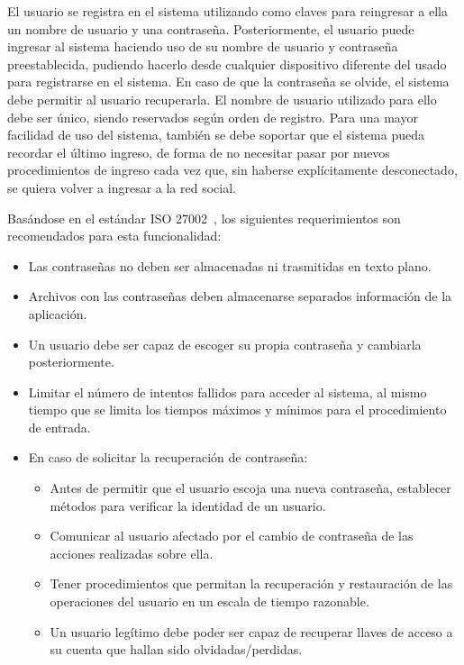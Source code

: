     El usuario se registra en el sistema utilizando como claves para reingresar a
    ella un nombre de usuario y una contraseña. Posteriormente, el usuario
    puede ingresar al sistema haciendo uso de su nombre de usuario y contraseña
    preestablecida, pudiendo hacerlo desde cualquier dispositivo diferente del
    usado para registrarse en el sistema. En caso de que la contraseña se
    olvide, el sistema debe permitir al usuario recuperarla. El nombre de
    usuario utilizado para ello debe ser único, siendo reservados según orden de
    registro. Para una mayor facilidad de uso del sistema, también se debe
    soportar que el sistema pueda recordar el último ingreso, de
    forma de no necesitar pasar por nuevos procedimientos de ingreso cada
    vez que, sin haberse explícitamente desconectado, se quiera volver a ingresar a la red social.

    Basándose en el estándar ISO
    27002~\cite{iso27002_2005}, los siguientes requerimientos son recomendados para esta funcionalidad:
    \begin{itemize}
      \item Las contraseñas no deben ser almacenadas ni trasmitidas en texto plano.
      \item Archivos con las contraseñas deben almacenarse separados información de la aplicación.
      \item Un usuario debe ser capaz de escoger su propia contraseña y cambiarla posteriormente.
      \item Limitar el número de intentos fallidos para acceder al sistema, al
        mismo tiempo que se limita los tiempos máximos y mínimos para el procedimiento
        de entrada. 
      \item En caso de solicitar la recuperación de contraseña:
      \begin{itemize} 
        \item Antes de permitir que el usuario escoja una nueva contraseña,
          establecer métodos para verificar la identidad de un usuario.
        \item Comunicar al usuario afectado por el cambio de contraseña de las acciones realizadas sobre ella.
        \item Tener procedimientos que permitan la recuperación y restauración de las operaciones del usuario en un escala de tiempo razonable.
        \item Un usuario legítimo debe poder ser capaz de recuperar llaves de acceso a su cuenta que hallan sido olvidadas/perdidas.
      \end{itemize}
    \end{itemize}
    
